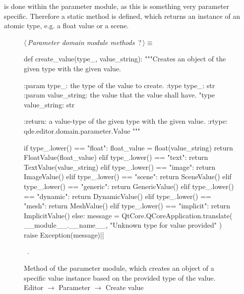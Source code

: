 \documentclass[%
    a4paper,    %
    justified,  %
    nobib,      %
    openany     %
]{tufte-book}
\begin{document}
 is done within the
parameter module, as this is something very parameter specific. Therefore a
static method is defined, which returns an instance of an atomic type, e.g. a
float value or a scene. 

\begin{figure}
\begin{flushleft} \small
\begin{minipage}{\linewidth}\label{scrap129}\raggedright\small
{} $\langle\,${\itshape Parameter domain module methods}\nobreak\ {\footnotesize {?}}$\,\rangle\equiv$
\vspace{-1ex}
\begin{pythoncode}
def create_value(type_, value_string):
    """Creates an object of the given type with the given value.

    :param type_: the type of the value to create.
    :type  type_: str
    :param value_string: the value that the value shall have.
    "type  value_string: str

    :return: a value-type of the given type with the given value.
    :rtype: qde.editor.domain.parameter.Value
    """

    if type_.lower() == "float":
        float_value = float(value_string)
        return FloatValue(float_value)
    elif type_.lower() == "text":
        return TextValue(value_string)
    elif type_.lower() == "image":
        return ImageValue()
    elif type_.lower() == "scene":
        return SceneValue()
    elif type_.lower() == "generic":
        return GenericValue()
    elif type_.lower() == "dynamic":
        return DynamicValue()
    elif type_.lower() == "mesh":
        return MeshValue()
    elif type_.lower() == "implicit":
        return ImplicitValue()
    else:
        message = QtCore.QCoreApplication.translate(
            __module__.__name__, "Unknown type for value provided"
        )
        raise Exception(message)|\NWsep|
\end{pythoncode}
\vspace{1.5ex}
\footnotesize
\begin{list}{}{\setlength{\itemsep}{-\parsep}\setlength{\itemindent}{-\leftmargin}}
\item \NWtxtMacroRefIn\ .

\item{}
\end{list}
\end{minipage}\vspace{4ex}
\end{flushleft}
\caption{Method of the parameter module, which creates an object of a specific
  value instance based on the provided type of the value.
  \newline{}\newline{}Editor $\rightarrow$ Parameter $\rightarrow$
  Create value}
\label{editor:lst:parameter:create-value}
\end{figure}
\end{document}
